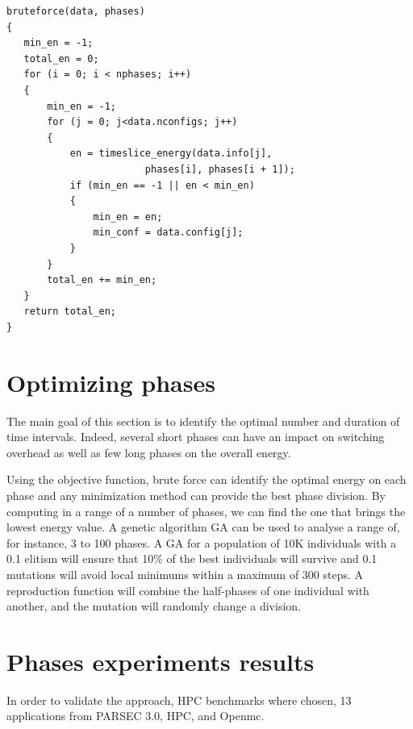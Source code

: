 \begin{lstlisting}
bruteforce(data, phases)
{
   min_en = -1;
   total_en = 0;
   for (i = 0; i < nphases; i++)
   {
       min_en = -1;
       for (j = 0; j<data.nconfigs; j++)
       {
           en = timeslice_energy(data.info[j], 
                        phases[i], phases[i + 1]);
           if (min_en == -1 || en < min_en)
           {
               min_en = en;
               min_conf = data.config[j];
           }
       }
       total_en += min_en;
   }
   return total_en;
}
\end{lstlisting}

\section{Optimizing phases} \label{sec:optimizing_phases}
The main goal of this section is to identify the optimal number and duration of time intervals. Indeed, several short phases can have an impact on switching overhead as well as few long phases on the overall energy. 

Using the objective function, brute force can identify the optimal energy on each phase and any minimization method can provide the best phase division. By computing in a range of a number of phases, we can find the one that brings the lowest energy value. A genetic algorithm GA can be used to analyse a range of, for instance, 3 to 100 phases. A GA for a population of 10K individuals with a 0.1 elitism will ensure that 10\% of the best individuals will survive and 0.1 mutations will avoid local minimums within a maximum of 300 steps. A reproduction function will combine the half-phases of one individual with another, and the mutation will randomly change a division.

\section{Phases experiments results} \label{sec:results_phases_experiments}


In order to validate the approach, HPC benchmarks where chosen, 13 applications from PARSEC 3.0, HPC, and Openmc.

